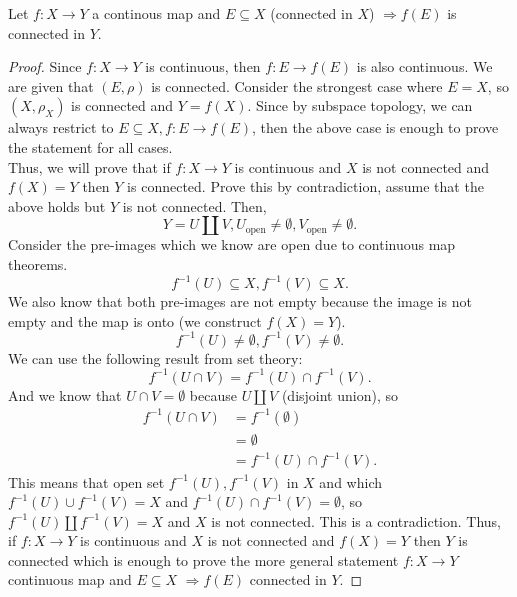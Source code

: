 \documentclass[a4paper]{article}
\begin{document}
\begin{theorem}
  Let $f:X \to Y$ a continous map and  $E \subseteq X$ (connected in  $X$) $\Rightarrow f(E)$ is connected in  $Y$.

  \begin{proof}
    Since $f:X \to Y$ is continuous, then  $f:E \to f(E)$ is also continuous. We are given that $\left( E,\rho \right) $ is connected. Consider the strongest case where $E =X$, so  $\left( X, \rho_X \right) $ is connected and $Y = f(X)$. Since by subspace topology, we can always restrict to $E \subseteq X, f:E \to f(E)$, then the above case is enough to prove the statement for all cases. \\


    Thus, we will prove that if $f:X \to Y$ is continuous and  $X$ is not connected and  $f(X) = Y$ then  $Y$ is connected. Prove this by contradiction, assume that the above holds but $Y$ is not connected. Then,
    \[
    Y = U \amalg V, U_{\text{open}} \neq \emptyset, V_{\text{open}} \neq \emptyset
    .\] 
    Consider the pre-images which we know are open due to continuous map theorems.
    \[
    f^{-1}\left( U \right) \subseteq X, f^{-1}\left( V \right) \subseteq X
    .\]
    We also know that both pre-images are not empty because the image is not empty and the map is onto (we construct $f(X) = Y$).
    \[
      f^{-1}\left( U \right) \neq \emptyset, f^{-1} \left( V \right)  \neq \emptyset
    .\]
    We can use the following result from set theory:
    \[
    f^{-1} \left( U \cap V \right) = f^{-1} (U) \cap f^{-1} (V)
    .\]
    And we know that $U \cap V = \emptyset$ because $U \amalg V$ (disjoint union), so
    \begin{align*}
      f^{-1} \left( U \cap V \right) &=    f^{-1} \left( \emptyset \right) \\
                                     &= \emptyset  \\
                                     &=  f^{-1} (U) \cap f^{-1} (V)
    .\end{align*}
    This means that open set $f^{-1}(U), f^{-1}(V)$ in $X$ and which $f^{-1}(U) \cup f^{-1}(V) = X$ and $f^{-1}(U) \cap f^{-1}(V) = \emptyset$, so $f^{-1}(U) \amalg f^{-1}(V) = X$ and $X$ is not connected. This is a contradiction. Thus,  if $f:X \to Y$ is continuous and  $X$ is not connected and  $f(X) = Y$ then  $Y$ is connected which is enough to prove the more general statement $f: X \to Y$ continuous map and  $E \subseteq X$  $\Rightarrow f(E)$ connected in  $Y$.
       
  \end{proof}
\end{theorem}
\end{document}
